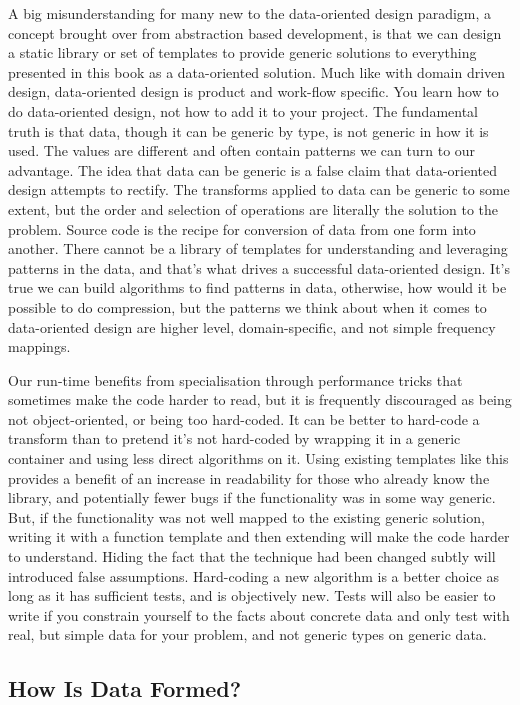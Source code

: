 \documentclass[a4paper,12pt]{article}
\begin{document}
A big misunderstanding for many new to the data-oriented design paradigm, a concept brought over from abstraction based development, is that we can design a static library or set of templates to provide generic solutions to everything presented in this book as a data-oriented solution.
Much like with domain driven design, data-oriented design is product and work-flow specific.
You learn how to do data-oriented design, not how to add it to your project.
The fundamental truth is that data, though it can be generic by type, is not generic in how it is used.
The values are different and often contain patterns we can turn to our advantage.
The idea that data can be generic is a false claim that data-oriented design attempts to rectify.
The transforms applied to data can be generic to some extent, but the order and selection of operations are literally the solution to the problem.
Source code is the recipe for conversion of data from one form into another.
There cannot be a library of templates for understanding and leveraging patterns in the data, and that's what drives a successful data-oriented design.
It's true we can build algorithms to find patterns in data, otherwise, how would it be possible to do compression, but the patterns we think about when it comes to data-oriented design are higher level, domain-specific, and not simple frequency mappings.

Our run-time benefits from specialisation through performance tricks that sometimes make the code harder to read, but it is frequently discouraged as being not object-oriented, or being too hard-coded.
It can be better to hard-code a transform than to pretend it's not hard-coded by wrapping it in a generic container and using less direct algorithms on it.
Using existing templates like this provides a benefit of an increase in readability for those who already know the library, and potentially fewer bugs if the functionality was in some way generic.
But, if the functionality was not well mapped to the existing generic solution, writing it with a function template and then extending will make the code harder to understand.
Hiding the fact that the technique had been changed subtly will introduced false assumptions.
Hard-coding a new algorithm is a better choice as long as it has sufficient tests, and is objectively new.
Tests will also be easier to write if you constrain yourself to the facts about concrete data and only test with real, but simple data for your problem, and not generic types on generic data.

\subsection{How Is Data Formed?}
\end{document}
